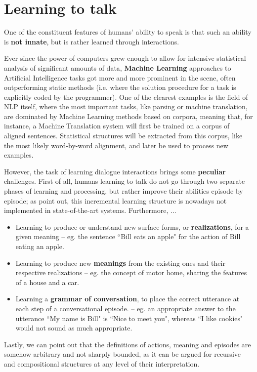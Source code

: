 
\section*{Learning to talk}

One of the constituent features of humans' ability to speak is that such an ability is \textbf{not innate}, but is rather learned through interactions.

Ever since the power of computers grew enough to allow for intensive statistical analysis of significant amounts of data, \textbf{Machine Learning} approaches to Artificial Intelligence tasks got more and more prominent in the scene, often outperforming static methods (i.e. where the solution procedure for a task is explicitly coded by the programmer).
One of the clearest examples is the field of NLP itself, where the most important tasks, like parsing or machine translation, are dominated by Machine Learning methods based on corpora,
meaning that, for instance, a Machine Translation system will first be trained on a corpus of aligned sentences. Statistical structures will be extracted from this corpus, like the most likely word-by-word alignment, and later be used to process new examples.

However, the task of learning dialogue interactions brings some \textbf{peculiar} challenges. First of all, humans learning to talk do not go through two separate phases of learning and processing, but rather improve their abilities episode by episode; as \cite{2095408} point out, this incremental learning structure is nowadays not implemented in state-of-the-art systems. Furthermore, ...
\begin{itemize}
	\item Learning to produce or understand new surface forms, or \textbf{realizations}, for a given meaning -- eg. the sentence ``Bill eats an apple" for the action of Bill eating an apple.
	\item Learning to produce new \textbf{meanings} from the existing ones and their respective realizations -- eg. the concept of motor home, sharing the features of a house and a car.
	\item Learning a \textbf{grammar of conversation}, to place the correct utterance at each step of a conversational episode. -- eg. an appropriate answer to the utterance ``My name is Bill" is ``Nice to meet you", whereas ``I like cookies" would not sound as much appropriate.
\end{itemize}
Lastly, we can point out that the definitions of actions, meaning and episodes are somehow arbitrary and not sharply bounded, as it can be argued for recursive and compositional structures at any level of their interpretation.

